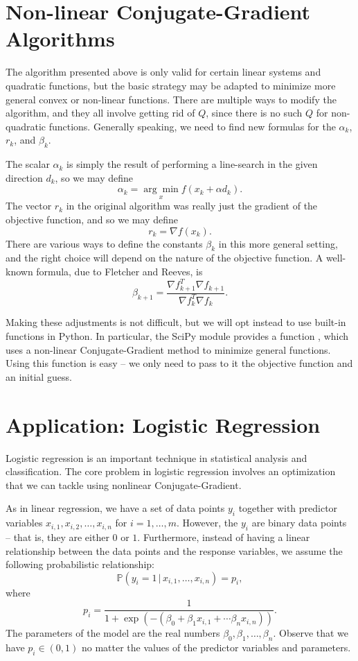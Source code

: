 \section*{Non-linear Conjugate-Gradient Algorithms}
The algorithm presented above is only valid for certain linear systems and quadratic functions, but the basic strategy may be adapted 
to minimize more general convex or non-linear functions. There are multiple ways to modify the algorithm, and they all involve getting 
rid of $Q$, since there is no such $Q$ for non-quadratic functions. Generally speaking, we need to find new formulas for the $\alpha_k$,  
$r_k$, and $\beta_k$. 

The scalar $\alpha_k$ is simply the result of performing a line-search in the given direction $d_k$, so we may define 
$$\alpha_k = \underset{x}{\arg\min}f(x_k + \alpha d_k).$$ 
The vector $r_k$ in the original algorithm was really just the gradient of the objective 
function, and so we may define $$r_k = \nabla f(x_k).$$ 
There are various ways to define the constants $\beta_k$ in this more general setting, and the 
right choice will depend on the nature of the objective function. A well-known formula, due to Fletcher and Reeves, is 
$$\beta_{k+1} = \frac{\nabla f_{k+1}^T \nabla f_{k+1}}{\nabla f_{k}^T \nabla f_{k}}.$$

Making these adjustments is not difficult, but we will opt instead to use built-in functions in Python. In particular,
the SciPy module  provides a function , which uses a non-linear Conjugate-Gradient method 
to minimize general functions. Using this function is easy -- we only need to pass to it the objective function and an
initial guess.

\section*{Application: Logistic Regression}
Logistic regression is an important technique in statistical analysis and classification. The core problem in 
logistic regression involves an optimization that we can tackle using nonlinear Conjugate-Gradient. 

As in linear regression, we have a set of data points $y_i$ together with predictor variables
$x_{i,1}, x_{i,2}, \ldots, x_{i,n}$ for $i = 1, \ldots, m$. However, the $y_i$ are binary data points --
that is, they are either $0$ or $1$. Furthermore, instead of having a linear relationship between the
data points and the response variables, we assume the following probabilistic relationship:
$$
\mathbb{P}(y_i = 1 \, | \, x_{i,1}, \ldots, x_{i,n}) = p_i,
$$
where
$$
p_i = \frac{1}{1+\exp(-(\beta_0 + \beta_1x_{i,1} + \cdots \beta_nx_{i,n}))}.
$$
The parameters of the model are the real numbers $\beta_0, \beta_1,\ldots, \beta_n$.
Observe that we have $p_i \in (0, 1)$ no matter the values of the predictor variables and parameters.  

